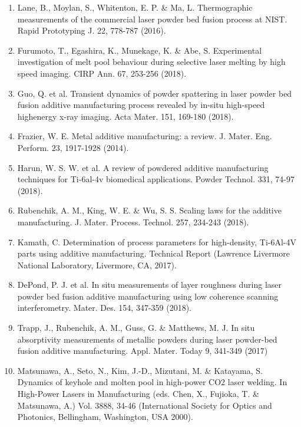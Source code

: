 \documentclass[10pt]{article}
\begin{document}
\begin{enumerate}
  \item Lane, B., Moylan, S., Whitenton, E. P. \& Ma, L. Thermographic measurements of the commercial laser powder bed fusion process at NIST. Rapid Prototyping J. 22, 778-787 (2016).

  \item Furumoto, T., Egashira, K., Munekage, K. \& Abe, S. Experimental investigation of melt pool behaviour during selective laser melting by high speed imaging. CIRP Ann. 67, 253-256 (2018).

  \item Guo, Q. et al. Transient dynamics of powder spattering in laser powder bed fusion additive manufacturing process revealed by in-situ high-speed highenergy x-ray imaging. Acta Mater. 151, 169-180 (2018).

  \item Frazier, W. E. Metal additive manufacturing: a review. J. Mater. Eng. Perform. 23, 1917-1928 (2014).

  \item Harun, W. S. W. et al. A review of powdered additive manufacturing techniques for Ti-6al-4v biomedical applications. Powder Technol. 331, 74-97 (2018).

  \item Rubenchik, A. M., King, W. E. \& Wu, S. S. Scaling laws for the additive manufacturing. J. Mater. Process. Technol. 257, 234-243 (2018).

  \item Kamath, C. Determination of process parameters for high-density, Ti-6Al-4V parts using additive manufacturing. Technical Report (Lawrence Livermore National Laboratory, Livermore, CA, 2017).

  \item DePond, P. J. et al. In situ measurements of layer roughness during laser powder bed fusion additive manufacturing using low coherence scanning interferometry. Mater. Des. 154, 347-359 (2018).

  \item Trapp, J., Rubenchik, A. M., Guss, G. \& Matthews, M. J. In situ absorptivity measurements of metallic powders during laser powder-bed fusion additive manufacturing. Appl. Mater. Today 9, 341-349 (2017)

  \item Matsunawa, A., Seto, N., Kim, J.-D., Mizutani, M. \& Katayama, S. Dynamics of keyhole and molten pool in high-power $\mathrm{CO} 2$ laser welding. In High-Power Lasers in Manufacturing (eds. Chen, X., Fujioka, T. \& Matsunawa, A.) Vol. 3888, 34-46 (International Society for Optics and Photonics, Bellingham, Washington, USA 2000).


\end{enumerate}
\end{document}
